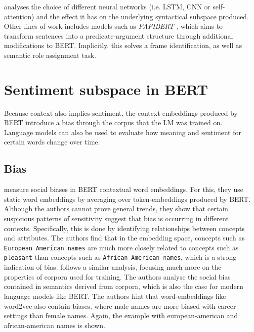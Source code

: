 \documentclass[a4paper,12pt,oneside,openright]{report}
\begin{document}
\cite{peters18} analyses the choice of different neural networks (i.e. LSTM, CNN or self-attention) and the effect it has on the underlying syntactical subspace produced. \\

Other lines of work includes models such as \textit{PAFIBERT} \cite{tan19}, which aims to transform sentences into a predicate-argument structure through additional modifications to BERT.
Implicitly, this solves a frame identification, as well as semantic role assignment task. \\

\section{Sentiment subspace in BERT}

Because context also implies sentiment, the context embeddings produced by BERT introduce a bias through the corpus that the LM was trained on.
Language models can also be used to evaluate how meaning and sentiment for certain words change over time.

\subsection{Bias} 

\cite{may19} measure social biases in BERT contextual word embeddings.
For this, they use static word embeddings by averaging over token-embeddings produced by BERT.
Although the authors cannot prove general trends, they show that certain suspicious patterns of sensitivity suggest that bias is occurring in different contexts.
Specifically, this is done by identifying relationships between concepts and attributes. 
The authors find that in the embedding space, concepts such as \texttt{European American names} are much more closely related to concepts such as \texttt{pleasant} than concepts such as \texttt{African American names}, which is a strong indication of bias.
\cite{caliskan19} follows a similar analysis, focusing much more on the properties of corpora used for training.
The authors analyse the social bias contained in semantics derived from corpora, which is also the case for modern language models like BERT.
The authors hint that word-embeddings like word2vec also contain biases, where male names are more biased with career settings than female names.
Again, the example with european-american and african-american names is shown. \\
\end{document}
